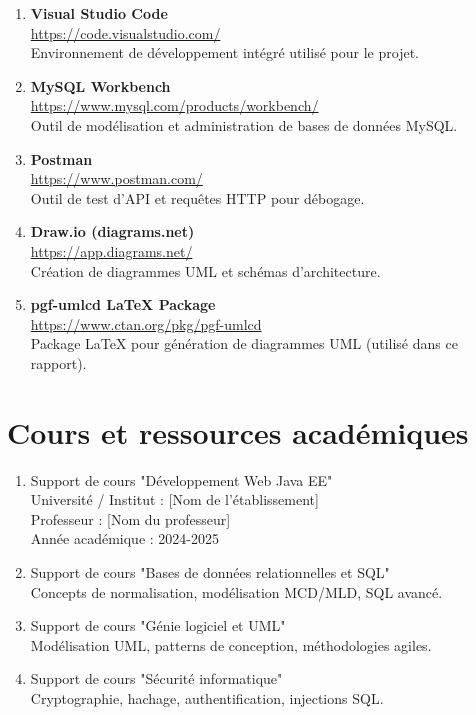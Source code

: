 \documentclass[12pt,a4paper]{report}
\begin{document}
\begin{enumerate}
    \item \textbf{Visual Studio Code} \\
    \url{https://code.visualstudio.com/} \\
    Environnement de développement intégré utilisé pour le projet.
    
    \item \textbf{MySQL Workbench} \\
    \url{https://www.mysql.com/products/workbench/} \\
    Outil de modélisation et administration de bases de données MySQL.
    
    \item \textbf{Postman} \\
    \url{https://www.postman.com/} \\
    Outil de test d'API et requêtes HTTP pour débogage.
    
    \item \textbf{Draw.io (diagrams.net)} \\
    \url{https://app.diagrams.net/} \\
    Création de diagrammes UML et schémas d'architecture.
    
    \item \textbf{pgf-umlcd LaTeX Package} \\
    \url{https://www.ctan.org/pkg/pgf-umlcd} \\
    Package LaTeX pour génération de diagrammes UML (utilisé dans ce rapport).
\end{enumerate}

\section*{Cours et ressources académiques}

\begin{enumerate}
    \item Support de cours "Développement Web Java EE" \\
    Université / Institut : [Nom de l'établissement] \\
    Professeur : [Nom du professeur] \\
    Année académique : 2024-2025
    
    \item Support de cours "Bases de données relationnelles et SQL" \\
    Concepts de normalisation, modélisation MCD/MLD, SQL avancé.
    
    \item Support de cours "Génie logiciel et UML" \\
    Modélisation UML, patterns de conception, méthodologies agiles.
    
    \item Support de cours "Sécurité informatique" \\
    Cryptographie, hachage, authentification, injections SQL.
\end{enumerate}
\end{document}
